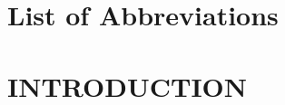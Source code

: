 \documentclass[12pt,oneside]{book}
\begin{document}
	\frontmatter
	
	
		
	\tableofcontents
	
	\listofalgorithms
	
	\listoftables
	
	\listoffigures
	
	\chapter*{List of Abbreviations}
	

	\mainmatter
	
	\chapter{INTRODUCTION}
\end{document}
